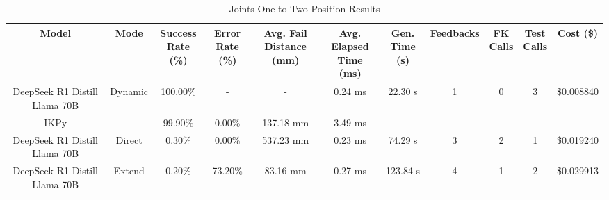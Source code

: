 \begin{landscape}
\begin{table}[H]
\tiny
\renewcommand{\arraystretch}{1.2}
\caption{Joints One to Two Position Results}
\begin{center}
\begin{tabular}{|c|c|c|c|c|c|c|c|c|c|c|}
    \hline
    \textbf{Model} & 
    \textbf{Mode} & 
    \makecell{\textbf{Success}\\\textbf{Rate (\%)}} &
    \makecell{\textbf{Error}\\\textbf{Rate (\%)}} &
    \makecell{\textbf{Avg. Fail}\\\textbf{Distance (mm)}} &
    \makecell{\textbf{Avg. Elapsed}\\\textbf{Time (ms)}} &
    \makecell{\textbf{Gen.}\\\textbf{Time (s)}} &
    \textbf{Feedbacks} &
    \makecell{\textbf{FK}\\\textbf{Calls}} &
    \makecell{\textbf{Test}\\\textbf{Calls}} &
    \textbf{Cost (\$)} \\
    \hline
    DeepSeek R1 Distill Llama 70B & Dynamic & 100.00\% & - & - & 0.24 ms & 22.30 s & 1 & 0 & 3 & \$0.008840 \\
    \hline
    IKPy & - & 99.90\% & 0.00\% & 137.18 mm & 3.49 ms & - & - & - & - & - \\
    \hline
    DeepSeek R1 Distill Llama 70B & Direct & 0.30\% & 0.00\% & 537.23 mm & 0.23 ms & 74.29 s & 3 & 2 & 1 & \$0.019240 \\
    \hline
    DeepSeek R1 Distill Llama 70B & Extend & 0.20\% & 73.20\% & 83.16 mm & 0.27 ms & 123.84 s & 4 & 1 & 2 & \$0.029913 \\
    \hline
\end{tabular}
\label{Results-Position-1-2}
\end{center}
\end{table}


\end{landscape}
